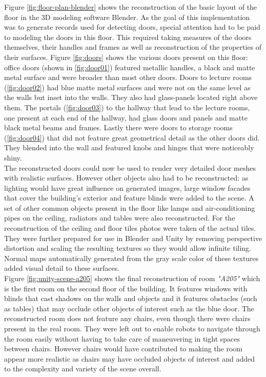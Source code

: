 Figure \ref{fig:floor-plan-blender} shows the reconstruction of the basic layout of the floor in the 3D modeling software Blender. As the goal of this implementation was to generate records used for detecting doors, special attention had to be paid to modeling the doors in this floor. This required taking measures of the doors themselves, their handles and frames as well as reconstruction of the properties of their surfaces. Figure \ref{fig:doors} shows the various doors present on this floor: office doors (shown in \ref{fig:door01}) featured metallic handles, a black and matte metal surface and were broader than most other doors. Doors to lecture rooms (\ref{fig:door02}) had blue matte metal surfaces and were not on the same level as the walls but inset into the walls. They also had glass-panels located right above them. The portals (\ref{fig:door03}) to the hallway that lead to the lecture rooms, one present at each end of the hallway, had glass doors and panels and matte black metal beams and frames. Lastly there were doors to storage rooms (\ref{fig:door04}) that did not feature great geometrical detail as the other doors did. They blended into the wall and featured knobs and hinges that were noticeably shiny.\\
The reconstructed doors could now be used to render very detailed door meshes with realistic surfaces. However other objects also had to be reconstructed: as lighting would have great influence on generated images, large window facades that cover the building's exterior and feature blinds were added to the scene. A set of other common objects present in the floor like lamps and air-conditioning pipes on the ceiling, radiators and tables were also reconstructed. For the reconstruction of the ceiling and floor tiles photos were taken of the actual tiles. They were further prepared for use in Blender and Unity by removing perspective distortion and scaling the resulting textures so they would allow infinite tiling. Normal maps automatically generated from the gray scale color of these textures added visual detail to these surfaces.\\
Figure \ref{fig:unity-scene-a205} shows the final reconstruction of room \emph{"A205"} which is the first room on the second floor of the building. It features windows with blinds that cast shadows on the walls and objects and it features obstacles (such as tables) that may occlude other objects of interest such as the blue door. The reconstructed room does not feature any chairs, even though there were chairs present in the real room. They were left out to enable robots to navigate through the room easily without having to take care of maneuvering in tight spaces between chairs. However chairs would have contributed to making the room appear more realistic as chairs may have occluded objects of interest and added to the complexity and variety of the scene overall.

